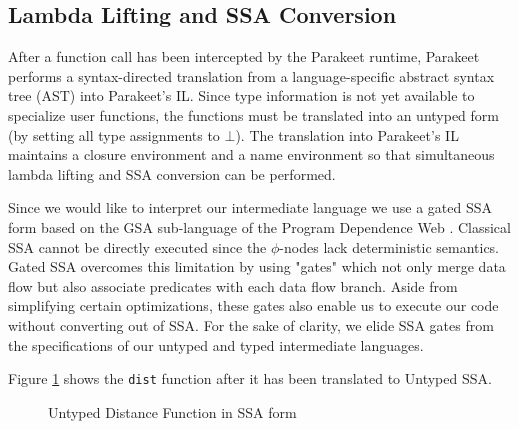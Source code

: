 \documentclass[10pt,twocolumn]{article}
\begin{document}
\subsection{Lambda Lifting and SSA Conversion}
After a function call has been intercepted by the Parakeet runtime, Parakeet performs a syntax-directed translation from a language-specific abstract syntax tree (AST) into Parakeet's IL. Since type information is not yet available to specialize user functions, the functions must be translated into an untyped
form (by setting all type assignments to $\bot$). The translation into Parakeet's IL maintains a closure environment and a name environment so that simultaneous lambda lifting and SSA conversion can be performed.

Since we would like to interpret our intermediate language we use a gated SSA form based on the GSA sub-language of the Program Dependence Web \cite{Ott90}. Classical SSA cannot be directly executed since the $\phi$-nodes lack deterministic semantics. Gated SSA overcomes this limitation by using "gates" which not only merge data flow but also associate predicates with each data flow branch. Aside from simplifying certain optimizations, these gates also enable us to execute our code without converting out of SSA.  For the sake of clarity, we elide SSA gates from the specifications of our untyped and typed intermediate languages. 

Figure \ref{UntypedSSADist} shows the \texttt{dist} function after it has been translated to Untyped SSA.

\begin{figure}[h!]
\caption{Untyped Distance Function in SSA form}
\label{UntypedSSADist}
\end{figure}
\end{document}
